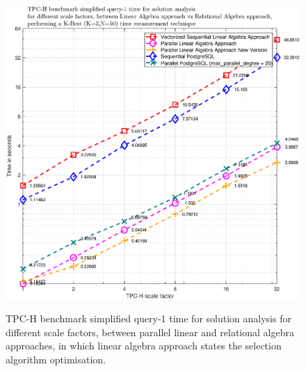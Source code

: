 \begin{figure}[H]
\centering
\caption{TPC-H benchmark simplified query-1 time for solution analysis for different scale factors, between parallel linear and relational algebra approaches, in which linear algebra approach states the selection algorithm optimisation.}
\includegraphics[width=0.95\columnwidth]{eps/TIME_LA_vs_RA_parallel_v2.eps}
\label{fig:time_la_vs_ra_parallel_v2}
\end{figure}


